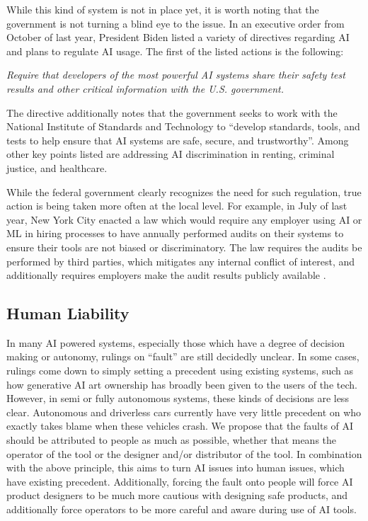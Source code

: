 \documentclass[10pt]{article}
\begin{document}
    While this kind of system is not in place yet, it is worth noting that the government is not turning a blind eye to the issue. In an executive order from October of last year, President Biden listed a variety of directives regarding AI and plans to regulate AI usage. The first of the listed actions is the following:

    \begin{center}
      \textit{Require that developers of the most powerful AI systems share their safety test results and other critical information with the U.S. government.\cite{whitehouse2023fact}}
    \end{center}

    The directive additionally notes that the government seeks to work with the National Institute of Standards and Technology to “develop standards, tools, and tests to help ensure that AI systems are safe, secure, and trustworthy”\cite{whitehouse2023fact}. Among other key points listed are addressing AI discrimination in renting, criminal justice, and healthcare.

    While the federal government clearly recognizes the need for such regulation, true action is being taken more often at the local level. For example, in July of last year, New York City enacted a law which would require any employer using AI or ML in hiring processes to have annually performed audits on their systems to ensure their tools are not biased or discriminatory. The law requires the audits be performed by third parties, which mitigates any internal conflict of interest, and additionally requires employers make the audit results publicly available \cite{kestenbaum2023nyc}.

  \subsection{Human Liability}

    In many AI powered systems, especially those which have a degree of decision making or autonomy, rulings on “fault” are still decidedly unclear. In some cases, rulings come down to simply setting a precedent using existing systems, such as how generative AI art ownership has broadly been given to the users of the tech. However, in semi or fully autonomous systems, these kinds of decisions are less clear. Autonomous and driverless cars currently have very little precedent on who exactly takes blame when these vehicles crash. We propose that the faults of AI should be attributed to people as much as possible, whether that means the operator of the tool or the designer and/or distributor of the tool. In combination with the above principle, this aims to turn AI issues into human issues, which have existing precedent. Additionally, forcing the fault onto people will force AI product designers to be much more cautious with designing safe products, and additionally force operators to be more careful and aware during use of AI tools.
\end{document}
